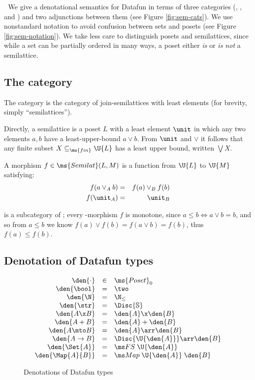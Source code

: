 
We give a denotational semantics for Datafun in terms of three categories
(, , and ) and two adjunctions between them (see
Figure \ref{fig:sem-cats}). We use nonstandard notation to avoid confusion
between sets and posets (see Figure \ref{fig:sem-notation}). We take less care
to distinguish posets and semilattices, since while a set can be partially
ordered in many ways, a poset either \emph{is} or \emph{is not} a semilattice.

\subsection{The category }

The category  is the category of join-semilattices with least
elements (for brevity, simply ``semilattices'').

Directly, a semilattice is a poset $L$ with a least element $\unit$ in which any
two elements $a,b$ have a least-upper-bound $a \vee b$. From $\unit$ and $\vee$
it follows that any finite subset $X \subseteq_{\ms{fin}} \U{L}$ has a least
upper bound, written $\bigvee X$.

A morphism $f \in \ms{Semilat}(L, M)$ is a function from $\U{L}$ to $\U{M}$
satisfying:
\begin{eqnarray*}
  f(a \vee_A b) &=& f(a) \vee_B f(b)\\
  f(\unit_A) &=& \unit_B
\end{eqnarray*}

 is a subcategory of ; every -morphism $f$ is
monotone, since $a \le b \iff a \vee b = b$, and so from $a \le b$ we know $f(a)
\vee f(b) = f(a \vee b) = f(b)$, thus $f(a) \le f(b)$.

\subsection{Denotation of Datafun types}
\begin{figure}
  \[\begin{array}{rcl}
  \den{\cdot} &\in& \ms{Poset}_0\\
  \den{\bool} &=& \two\\
  \den{\N} &=& \N_\le\\
  \den{\str} &=& \Disc{\mathbb{S}}\\
  \den{A \x B} &=& \den{A} \x \den{B}\\
  \den{A + B} &=& \den{A} + \den{B}\\
  \den{A \mto B} &=& \den{A} \arr \den{B}\\
  \den{A \uto B} &=& \Disc{\U{\den{A}}} \arr \den{B}\\
  \den{\Set{A}} &=& \FS{\U{\den{A}}}\\
  \den{\Map{A}{B}} &=& \FM{\U{\den{A}}}{\den{B}}
  \end{array}\]
  \caption{Denotations of Datafun types}
  \label{fig:sem-types}
\end{figure}

